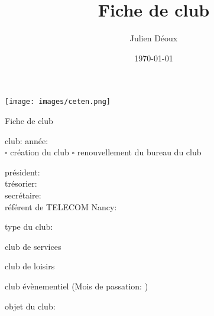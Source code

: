 \documentclass{article}
\title{Fiche de club}
\author{Julien Déoux}
\date\today
\begin{document}
	
	\begin{titlepage}
		\begin{center}
			\texttt{[image: images/ceten.png]}\par
			\vspace{0.5cm}
			{\Huge \light{} Fiche de club}\par
			\vspace{1cm}
		\end{center}
		\begin{center}
			club: \underline{\hspace{8cm}}
			année: \underline{\hspace{1.5cm}}\\
			\vspace{\baselineskip}
			$\square$ création du club
			\hspace{3cm}
			$\square$ renouvellement du bureau du club\\
			\vspace{\baselineskip}
			\begin{spacing}{1.5}
				président: \underline{\hspace{7cm}}\\
				trésorier: \underline{\hspace{7cm}}\\
				secrétaire: \underline{\hspace{7cm}}\\
				référent de TELECOM Nancy: \underline{\hspace{7cm}}\\
			\end{spacing}
		\end{center}
		type du club:
		\begin{todolist}
		\item club de services
		\item club de loisirs
		\item club évènementiel (Mois de passation:
			\underline{\hspace{5cm}})
		\end{todolist}
		\vspace{\baselineskip}
		objet du club:\\
		\hspace{\textwidth}\\
		\underline{\hspace{\textwidth}}\\
		\hspace{\textwidth}\\
		\underline{\hspace{\textwidth}}\\
		\hspace{\textwidth}\\
		\underline{\hspace{\textwidth}}\\

	\end{titlepage}
\end{document}
